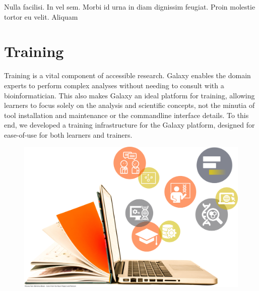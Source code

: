 \begin{savequote}[75mm]
Nulla facilisi. In vel sem. Morbi id urna in diam dignissim feugiat. Proin molestie tortor eu velit. Aliquam
\end{savequote}

\chapter{Training}
\label{chapter:training}

Training is a vital component of accessible research. Galaxy enables the domain experts to perform complex analyses without needing to consult with a bioinformatician. This also makes Galaxy an ideal platform for training, allowing learners to focus solely on the analysis and scientific concepts, not the minutia of tool installation and maintenance or the commandline interface details. To this end, we developed a training infrastructure for the Galaxy platform, designed for ease-of-use for both learners and trainers.

\begin{figure}[t!]
\includegraphics[scale=0.1]{chapters/images/training-coverart.jpg}
\end{figure}
\setcounter{figure}{-1}
\setcounter{table}{-1}
\setcounter{section}{-1}
